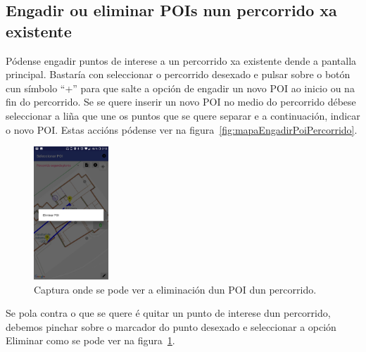 \subsection{Engadir ou eliminar POIs nun percorrido xa existente}
Pódense engadir puntos de interese a un percorrido xa existente dende a pantalla principal. Bastaría con seleccionar o percorrido desexado e pulsar sobre o botón cun símbolo ``+'' para que salte a opción de engadir un novo POI ao inicio ou na fin do percorrido. Se se quere inserir un novo POI no medio do percorrido débese seleccionar a liña que une os puntos que se quere separar e a continuación, indicar o novo POI. Estas accións pódense ver na figura~\ref{fig:mapaEngadirPoiPercorrido}.

\begin{figure}[h]
	\begin{center}
		\includegraphics[width=0.25\textwidth]{figures/android/mapaEliminarPoiPercorrido}
		\caption{Captura onde se pode ver a eliminación dun POI dun percorrido.}
		\label{fig:mapaEliminarPoiPercorrido}
	\end{center}
\end{figure}

Se pola contra o que se quere é quitar un punto de interese dun percorrido, debemos pinchar sobre o marcador do punto desexado e seleccionar a opción Eliminar como se pode ver na figura~\ref{fig:mapaEliminarPoiPercorrido}.

